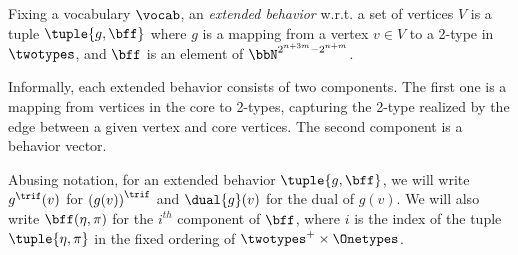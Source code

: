 \begin{definition}
    Fixing a vocabulary $\vocab$, an \emph{extended behavior} w.r.t. 
    a set of vertices $V$ is a tuple $\tuple{g, \bff}$ where
    $g$ is a mapping from a vertex $v \in V$ to a 2-type in $\twotypes$, 
    and
    $\bff$ is an element of $\bbN^{2^{n+3m}-2^{n+m}}$.

\end{definition}

Informally, each extended behavior consists of two components.
The first one is a mapping from vertices in the core to 2-types,
capturing the 2-type realized by the edge between a given vertex and core vertices.
The second component is a behavior vector.

Abusing notation, for an extended behavior $\tuple{g, \bff}$,
we will write $g^\trif(v)$ for ${(g(v))}^\trif$ and
$\dual{g}(v)$ for the dual of $g(v)$.
We will also write
$\bff(\eta, \pi)$ for the $i^{th}$ component of $\bff$,
where $i$ is the index of the tuple $\tuple{\eta, \pi}$ in the fixed ordering of $\twotypes^+ \times \Onetypes$.

